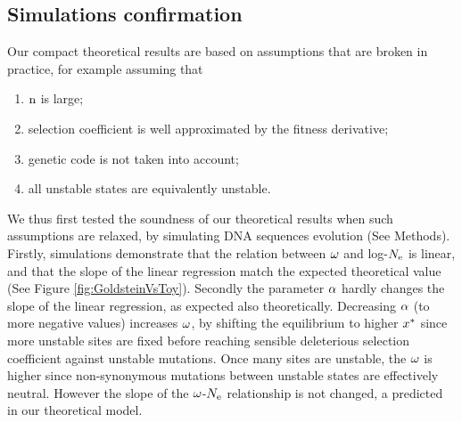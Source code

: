 \documentclass{article}
\begin{document}
\subsection*{Simulations confirmation}
Our compact theoretical results are based on assumptions that are broken in practice, for example assuming that 
\begin{enumerate}
 \item $\text{n}$ is large;
 \item selection coefficient is well approximated by the fitness derivative;
 \item genetic code is not taken into account;
 \item all unstable states are equivalently unstable.
\end{enumerate}
We thus first tested the soundness of our theoretical results when such assumptions are relaxed, by simulating DNA sequences evolution (See Methods). 
Firstly, simulations demonstrate that the relation between $\omega$ and log-$N_{\mathrm{e}}$ is linear, and that the slope of the linear regression match the expected theoretical value (See Figure \ref{fig:GoldsteinVsToy}).
Secondly the parameter $\alpha$ hardly changes the slope of the linear regression, as expected also theoretically.
Decreasing $\alpha$ (to more negative values) increases $\omega$, by shifting the equilibrium to higher $x^{*}$ since more unstable sites are fixed before reaching sensible deleterious selection coefficient against unstable mutations. Once many sites are unstable, the $\omega$ is higher since non-synonymous mutations between unstable states are effectively neutral. However the slope of the $\omega$-$N_{\mathrm{e}}$ relationship is not changed, a predicted in our theoretical model.\\
\end{document}
